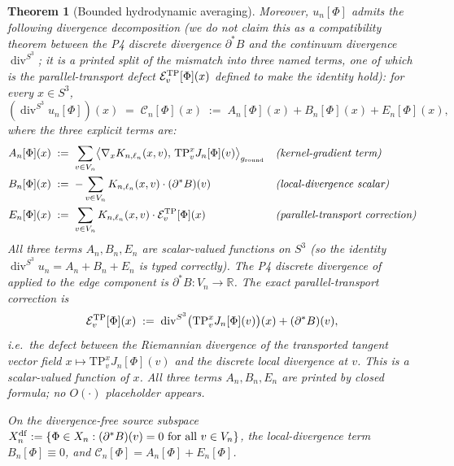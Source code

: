 \documentclass[11pt, a4paper]{amsart}
\newtheorem{theorem}{Theorem}[section]
\theoremstyle{definition}
\newcommand{\R}{\mathbb{R}}
\newcommand{\divS}{\operatorname{div}^{S^3}}
\begin{document}
\begin{theorem}[Bounded hydrodynamic averaging]
Moreover, $u_n[\Phi]$ admits the following \emph{divergence
decomposition} (we do not claim this as a compatibility theorem
between the P4 discrete divergence $\partial^\ast B$ and the
continuum divergence $\divS$; it is a printed split of the
mismatch into three named terms, one of which is the
parallel-transport defect $\mathcal E^{\rm TP}_v[\Phi](x)$
\emph{defined} to make the identity hold): for every $x \in S^3$,
\[
  (\divS u_n[\Phi])(x) \;=\; \mathcal C_n[\Phi](x)
    \;:=\; A_n[\Phi](x) + B_n[\Phi](x) + E_n[\Phi](x),
\]
where the three explicit terms are:
\begin{align*}
  A_n[\Phi](x)
    &\;:=\; \sum_{v \in V_n}
       \bigl\langle \nabla_x K_{n, \ell_n}(x, v),\,
       \mathrm{TP}_v^x J_n[\Phi](v)\bigr\rangle_{g_{\rm round}}
    && \text{\emph{(kernel-gradient term)}} \\
  B_n[\Phi](x)
    &\;:=\; -\sum_{v \in V_n} K_{n, \ell_n}(x, v) \cdot
       (\partial^\ast B)(v)
    && \text{\emph{(local-divergence scalar)}} \\
  E_n[\Phi](x)
    &\;:=\; \sum_{v \in V_n} K_{n, \ell_n}(x, v) \cdot
       \mathcal E^{\rm TP}_v[\Phi](x)
    && \text{\emph{(parallel-transport correction)}}
\end{align*}
All three terms $A_n, B_n, E_n$ are scalar-valued functions on
$S^3$ (so the identity $\divS u_n = A_n + B_n + E_n$ is typed
correctly). The P4 discrete divergence of
\cite[Def.~3.3]{ClosureDynamics} applied to the edge component
is $\partial^\ast B \colon V_n \to \R$. The \emph{exact}
parallel-transport correction is
\[
  \mathcal E^{\rm TP}_v[\Phi](x) \;:=\;
    \divS\bigl(\mathrm{TP}_v^x J_n[\Phi](v)\bigr)(x)
    + (\partial^\ast B)(v),
\]
i.e.\ the defect between the Riemannian divergence of the
transported tangent vector field $x \mapsto \mathrm{TP}_v^x
J_n[\Phi](v)$ and the discrete local divergence at $v$. This is
a scalar-valued function of $x$. All three terms $A_n, B_n,
E_n$ are printed by closed formula; no $O(\cdot)$ placeholder
appears.

On the \emph{divergence-free source subspace}
$X_n^{\rm df} := \{\Phi \in X_n : (\partial^\ast B)(v) = 0
\text{ for all } v \in V_n\}$, the local-divergence term
$B_n[\Phi] \equiv 0$, and $\mathcal C_n[\Phi] = A_n[\Phi] +
E_n[\Phi]$.
\end{theorem}
\end{document}
